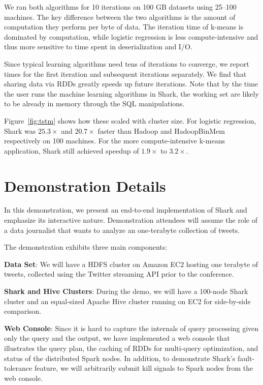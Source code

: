 \documentclass[preprint]{acm_proc_article-sp}
\newcommand{\HadoopBM}{HadoopBinMem\xspace}
\begin{document}
We ran both algorithms for 10 iterations on 100 GB datasets using 25--100 machines. The key difference between the two algorithms is the amount of computation they perform per byte of data. The
iteration time of k-means is dominated by computation, while
logistic regression is less compute-intensive and thus more sensitive
to time spent in deserialization and I/O.

Since typical learning algorithms need tens of iterations to converge,
we report times for the first iteration and subsequent iterations separately.
We find that sharing data via RDDs greatly speeds up future iterations. Note that by the time the user runs the machine learning algorithms in Shark, the working set are likely to be already in memory through the SQL manipulations.

Figure~\ref{fig:tstm} shows how these scaled with cluster size. For logistic regression, Shark was $25.3\times$ and $20.7\times$ faster than Hadoop and \HadoopBM respectively on 100 machines. For the more compute-intensive k-means application, Shark still achieved speedup of $1.9\times$ to $3.2\times$.


\section{Demonstration Details}

In this demonstration, we present an end-to-end implementation of Shark and emphasize its interactive nature. Demonstration attendees will assume the role of a data journalist that wants to analyze an one-terabyte collection of tweets. 

The demonstration exhibits three main components:

\textbf{Data Set}: We will have a HDFS cluster on Amazon EC2 hosting one terabyte of tweets, collected using the Twitter streaming API prior to the conference.

\textbf{Shark and Hive Clusters}: During the demo, we will have a 100-node Shark cluster and an equal-sized Apache Hive cluster running on EC2 for side-by-side comparison.

\textbf{Web Console}: Since it is hard to capture the internals of query processing given only the query and the output, we have implemented a web console that illustrates the query plan, the caching of RDDs for multi-query optimization, and status of the distributed Spark nodes. In addition, to demonstrate Shark's fault-tolerance feature, we will arbitrarily submit kill signals to Spark nodes from the web console.
\end{document}
